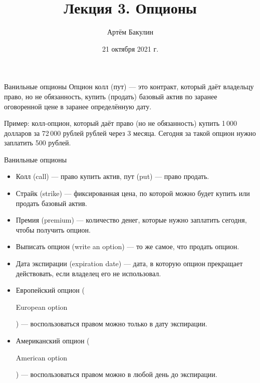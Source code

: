 \documentclass{beamer}
\title{Лекция 3. Опционы}
\author{Артём Бакулин}
\date{21 октября 2021 г.}
\newcommand{\en}[1]{\begin{otherlanguage}{english}#1\end{otherlanguage}}
\begin{document}
\begin{frame}
\titlepage
\end{frame}



\begin{frame}{Ванильные опционы}
\justifying
\alert{Опцион колл (пут)} --- это контракт, который даёт владельцу право, но не обязанность, купить (продать) базовый актив по заранее оговоренной цене в заранее определённую дату. 

\justify
Пример: колл-опцион, который даёт право (но не обязанность) купить 1\,000 долларов за 72\,000 рублей рублей через 3 месяца. Сегодня за такой опцион нужно заплатить 500 рублей.
\end{frame}



\begin{frame}{Ванильные опционы}
\begin{itemize}
\justifying
\item Колл (call) --- право купить актив, пут (put) --- право продать.
\item Страйк (strike) --- фиксированная цена, по которой можно будет купить или продать базовый актив.
\item Премия (premium) --- количество денег, которые нужно заплатить сегодня, чтобы получить опцион.
\item Выписать опцион (write an option) --- то же самое, что продать опцион.
\item Дата экспирации (expiration date) --- дата, в которую опцион прекращает действовать, если владелец его не использовал.
\item Европейский опцион (\en{European option}) --- воспользоваться правом можно только в дату экспирации.
\item Американский опцион (\en{American option}) --- воспользоваться правом можно в любой день до экспирации.
\end{itemize}
\end{frame}



\newcommand{\circlewithtext}[3]{
    \node[circle, fill, inner sep = 1.5pt] at (#1, #2) {};
    \node[anchor = north] at (#1, #2) {#3};
}
\end{document}
